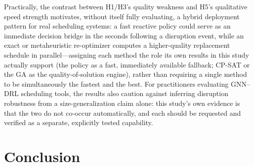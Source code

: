 \documentclass[11pt]{article}
\begin{document}
Practically, the contrast between H1/H3's quality weakness and H5's qualitative speed strength motivates, without itself fully evaluating, a hybrid deployment pattern for real scheduling systems: a fast reactive policy could serve as an immediate decision bridge in the seconds following a disruption event, while an exact or metaheuristic re-optimizer computes a higher-quality replacement schedule in parallel---assigning each method the role its own results in this study actually support (the policy as a fast, immediately available fallback; CP-SAT or the GA as the quality-of-solution engine), rather than requiring a single method to be simultaneously the fastest and the best. For practitioners evaluating GNN--DRL scheduling tools, the results also caution against inferring disruption robustness from a size-generalization claim alone: this study's own evidence is that the two do not co-occur automatically, and each should be requested and verified as a separate, explicitly tested capability.

\section{Conclusion}
\label{sec:conclusion}
\end{document}
